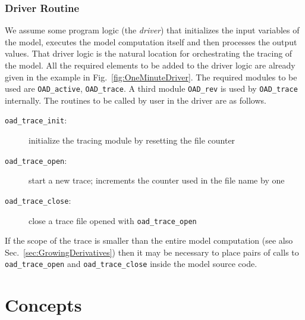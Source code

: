 \documentclass{article}
\newcommand{\refsec}[1]{{Sec.~\ref{#1}}}
\newcommand{\reffig}[1]{{Fig.~\ref{#1}}}
\begin{document}
\subsubsection{Driver Routine}\label{sec:DriverRoutine}

We assume some program logic (the {\em driver}) that initializes the input variables of the model, executes the model 
computation itself and then processes the output values. 
That driver logic  is the natural location for orchestrating the tracing of the model. 
All the required elements to be added to the driver logic are already given in the example 
in \reffig{fig:OneMinuteDriver}. The required modules to be used are \lstinline{OAD_active}, 
\lstinline{OAD_trace}. A third module \lstinline{OAD_rev} is used by \lstinline{OAD_trace}
internally. The routines to be called by user in the driver are as follows.
\begin{description}
\item[{\tt oad\_trace\_init}:] initialize the tracing module by resetting the file counter
\item[{\tt oad\_trace\_open}:] start a new trace; increments the counter used in the file name by one
\item[{\tt oad\_trace\_close}:] close a trace file opened with \lstinline{oad_trace_open}
\end{description}   
If the scope of the trace is smaller than the entire model computation (see also \refsec{sec:GrowingDerivatives})
then it may be necessary to place pairs of calls to \lstinline{oad_trace_open} and \lstinline{oad_trace_close} inside the model 
source code. 

\section{Concepts}
\end{document}
